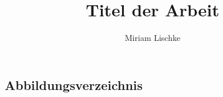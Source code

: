 \documentclass[12pt, a4paper, oneside]{article}
\title{\textbf{Titel der Arbeit}}
\author{Miriam Lischke}
\begin{document}


\begin{spacing}{1}
\setcounter{page}{2}
\tableofcontents
\end{spacing}
\newpage
\begin{spacing}{1}
\section*{Abbildungsverzeichnis} 
\renewcommand{\listfigurename}{}
\listoffigures
\end{spacing}

\end{document}
